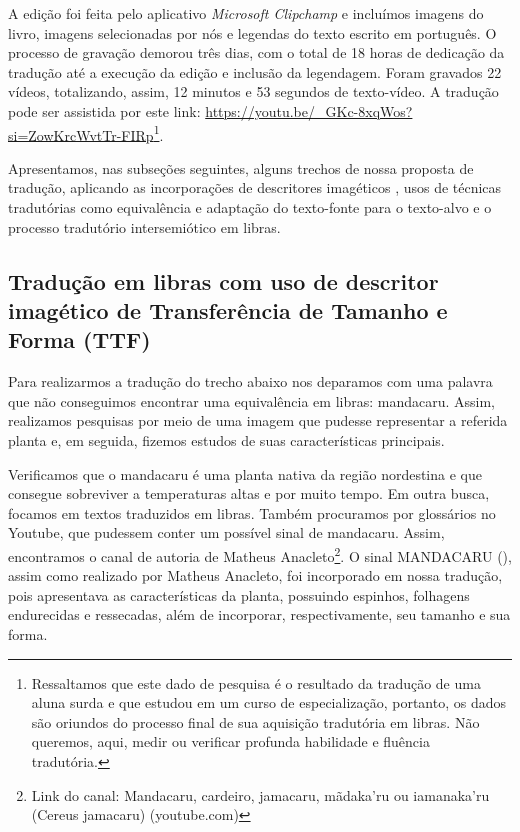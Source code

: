 \documentclass[portuguese]{textolivre}
\begin{document}
A edição foi feita pelo aplicativo \textit{Microsoft Clipchamp} e incluímos imagens do livro, imagens selecionadas por nós e legendas do texto escrito em português. O processo de gravação demorou três dias, com o total de 18 horas de dedicação da tradução até a execução da edição e inclusão da legendagem. Foram gravados 22 vídeos, totalizando, assim, 12 minutos e 53 segundos de texto-vídeo. A tradução pode ser assistida por este link: \url{https://youtu.be/_GKc-8xqWos?si=ZowKrcWvtTr-FIRp}\footnote{Ressaltamos que este dado de pesquisa é o resultado da tradução de uma aluna surda e que estudou em um curso de especialização, portanto, os dados são oriundos do processo final de sua aquisição tradutória em libras. Não queremos, aqui, medir ou verificar profunda habilidade e fluência tradutória.}.

Apresentamos, nas subseções seguintes, alguns trechos de nossa proposta de tradução, aplicando as incorporações de descritores imagéticos \cite{campello2008visualidade}, usos de técnicas tradutórias como equivalência e adaptação do texto-fonte para o texto-alvo e o processo tradutório intersemiótico em libras.

\subsection{Tradução em libras com uso de descritor imagético de Transferência de Tamanho e Forma (TTF)}\label{sec-modelo}
Para realizarmos a tradução do trecho abaixo nos deparamos com uma palavra que não conseguimos encontrar uma equivalência em libras: mandacaru. Assim, realizamos pesquisas por meio de uma imagem que pudesse representar a referida planta e, em seguida, fizemos estudos de suas características principais. 

Verificamos que o mandacaru é uma planta nativa da região nordestina e que consegue sobreviver a temperaturas altas e por muito tempo. Em outra busca, focamos em textos traduzidos em libras. Também procuramos por glossários no Youtube, que pudessem conter um possível sinal de mandacaru. Assim, encontramos o canal de autoria de Matheus Anacleto\footnote{Link do canal: Mandacaru, cardeiro, jamacaru, mãdaka'ru ou iamanaka'ru (Cereus jamacaru) (youtube.com)}. O sinal MANDACARU (), assim como realizado por Matheus Anacleto, foi incorporado em nossa tradução, pois apresentava as características da planta, possuindo espinhos, folhagens endurecidas e ressecadas, além de incorporar, respectivamente, seu tamanho e sua forma. 
\end{document}
